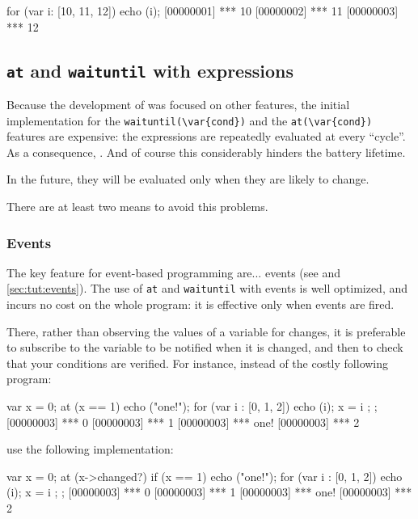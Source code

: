 \begin{urbiscript}
for (var i: [10, 11, 12]) echo (i);
[00000001] *** 10
[00000002] *** 11
[00000003] *** 12
\end{urbiscript}

\subsection{\lstinline|at| and \lstinline|waituntil| with expressions}
\label{sec:faq:atexp}
Because the development of \us was focused on other features, the
initial implementation for the \lstinline|waituntil(\var{cond})| and
the \lstinline|at(\var{cond})| features are expensive: the expressions
 are repeatedly evaluated at every ``cycle''.  As a
consequence, .  And of
course this considerably hinders the battery lifetime.

In the future, they will be evaluated only when they are likely to
change.

There are at least two means to avoid this problems.

\subsubsection{Events}
The key \us feature for event-based programming are... events (see
 and \autoref{sec:tut:events}).  The use of
\lstinline|at| and \lstinline|waituntil| with events is well
optimized, and incurs no cost on the whole program: it is effective
only when events are fired.

There, rather than observing the values of a variable for changes, it
is preferable to subscribe to the variable to be notified when it is
changed, and then to check that your conditions are verified.  For
instance, instead of the costly following program:

\begin{urbiscript}
{
  var x = 0;
  at (x == 1)
    echo ("one!");
  for (var i : [0, 1, 2])
  {
    echo (i);
    x = i
  };
};
[00000003] *** 0
[00000003] *** 1
[00000003] *** one!
[00000003] *** 2
\end{urbiscript}

\noindent
use the following implementation:

\begin{urbiscript}
{
  var x = 0;
  at (x->changed?)
    if (x == 1)
      echo ("one!");
  for (var i : [0, 1, 2])
  {
    echo (i);
    x = i
  };
};
[00000003] *** 0
[00000003] *** 1
[00000003] *** one!
[00000003] *** 2
\end{urbiscript}

